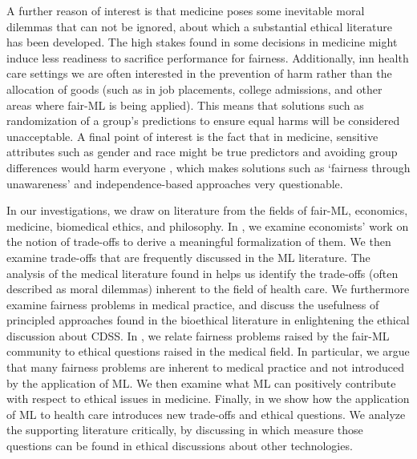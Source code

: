 A further reason of interest is that medicine poses some inevitable moral dilemmas that can not be ignored, about which a substantial ethical literature has been developed.
The high stakes found in some decisions in medicine might induce less readiness to sacrifice performance for fairness.
Additionally, inn health care settings we are often interested in the prevention of harm rather than the allocation of goods (such as in job placements, college admissions, and other areas where fair-ML is being applied).
This means that solutions such as randomization of a group's predictions to ensure equal harms will be considered unacceptable.
A final point of interest is the fact that in medicine, sensitive attributes such as gender and race might be true predictors and avoiding group differences would harm everyone \cite{Mccradden2020}, which makes solutions such as `fairness through unawareness' and independence-based approaches very questionable.

In our investigations, we draw on literature from the fields of fair-ML, economics, medicine, biomedical ethics, and philosophy.
In , we examine economists' work on the notion of trade-offs to derive a meaningful formalization of them.
We then examine trade-offs that are frequently discussed in the ML literature.
The analysis of the medical literature found in  helps us identify the trade-offs (often described as moral dilemmas) inherent to the field of health care.
We furthermore examine fairness problems in medical practice, and discuss the usefulness of principled approaches found in the bioethical literature in enlightening the ethical discussion about CDSS.
In , we relate fairness problems raised by the fair-ML community to ethical questions raised in the medical field.
In particular, we argue that many fairness problems are inherent to medical practice and not introduced by the application of ML.
We then examine what ML can positively contribute with respect to ethical issues in medicine.
Finally, in  we show how the application of ML to health care introduces new trade-offs and ethical questions.
We analyze the supporting literature critically, by discussing in which measure those questions can be found in ethical discussions about other technologies.
